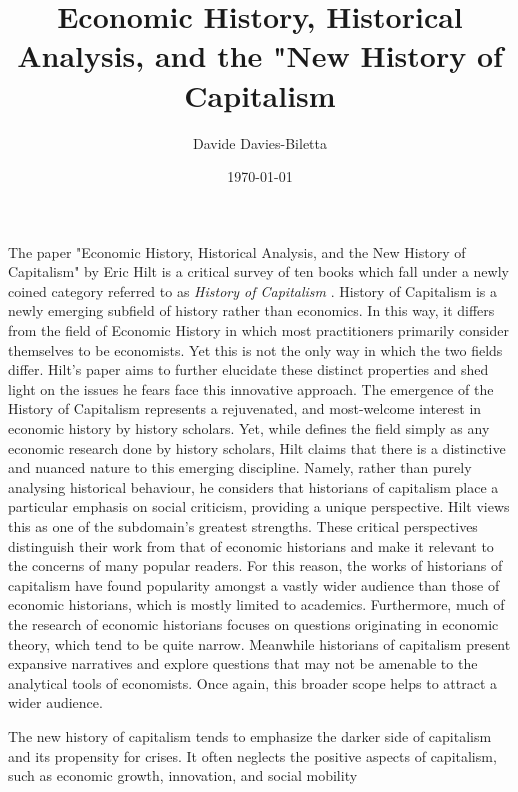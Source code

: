 \documentclass[10pt]{article}
\title{ Economic History, Historical Analysis, and the "New History of Capitalism }
\author{Davide Davies-Biletta}
\date{\today}
\newcommand{\bb}{\bigbreak\noindent}
\begin{document}
	\maketitle
	\setcounter{page}{1}
	\begin{spacing}{1.5}
		\bb
		The paper "Economic History, Historical Analysis, and the New History of Capitalism" by Eric Hilt is a critical survey of ten books which fall under a newly coined category referred to as \textit{History of Capitalism} \parencite{hilt2017economic}. History of Capitalism is a newly emerging subfield of history rather than economics. In this way, it differs from the field of Economic History in which most practitioners primarily consider themselves to be economists. Yet this is not the only way in which the two fields differ. Hilt's paper aims to further elucidate these distinct properties and shed light on the issues he fears face this innovative approach.
		\bb
		The emergence of the History of Capitalism represents a rejuvenated, and most-welcome interest in economic history by history scholars. Yet, while \cite{beckert2012history} defines the field simply as any economic research done by history scholars, Hilt claims that there is a distinctive and nuanced nature to this emerging discipline. Namely, rather than purely analysing historical behaviour, he considers that historians of capitalism place a particular emphasis on social criticism, providing a unique perspective.
		Hilt views this as one of the subdomain's greatest strengths. These critical perspectives distinguish their work from that of economic historians and make it relevant to the concerns of many popular readers. For this reason, the works of historians of capitalism have found popularity amongst a vastly wider audience than those of economic historians, which is mostly limited to academics. Furthermore, much of the research of economic historians focuses on questions originating in economic theory, which tend to be quite narrow. Meanwhile historians of capitalism present expansive narratives and explore questions that may not be amenable to the analytical tools of economists. Once again, this broader scope helps to attract a wider audience. 
		
		The new history of capitalism tends to emphasize the darker side of capitalism and its propensity for crises. It often neglects the positive aspects of capitalism, such as economic growth, innovation, and social mobility
		

\end{spacing}
\end{document}
